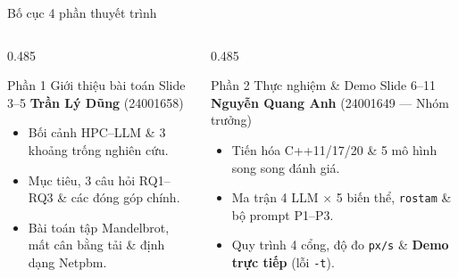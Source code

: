 \documentclass[aspectratio=169,10pt]{beamer}
\newcommand{\currentpart}{Mở đầu}
\newcommand{\setpart}[1]{\renewcommand{\currentpart}{#1}}
\newcommand{\code}[1]{\texttt{\color{BlueDark}#1}}
\begin{document}
\setpart{Mở đầu \textbullet{} Bố cục}
\begin{frame}{Bố cục 4 phần thuyết trình}
\begin{columns}[T,totalwidth=\textwidth]
  \begin{column}{0.485\textwidth}
    \begin{bluebox}[height=2.95cm]{Phần 1 \;\textbullet\; Giới thiệu bài toán \hfill {\scriptsize Slide 3--5}}
      \textbf{\footnotesize Trần Lý Dũng} {\scriptsize(\color{Muted}24001658)}
      \begin{itemize}\scriptsize\setlength{\itemsep}{2pt}
        \item Bối cảnh HPC--LLM \& 3 khoảng trống nghiên cứu.
        \item Mục tiêu, 3 câu hỏi RQ1--RQ3 \& các đóng góp chính.
        \item Bài toán tập Mandelbrot, mất cân bằng tải \& định dạng Netpbm.
      \end{itemize}
    \end{bluebox}
  \end{column}
  \begin{column}{0.485\textwidth}
    \begin{bluebox}[height=2.95cm]{Phần 2 \;\textbullet\; Thực nghiệm \& Demo \hfill {\scriptsize Slide 6--11}}
      \textbf{\footnotesize Nguyễn Quang Anh} {\scriptsize(\color{Muted}24001649 --- Nhóm trưởng)}
      \begin{itemize}\scriptsize\setlength{\itemsep}{2pt}
        \item Tiến hóa C++11/17/20 \& 5 mô hình song song đánh giá.
        \item Ma trận 4 LLM $\times$ 5 biến thể, \code{rostam} \& bộ prompt P1--P3.
        \item Quy trình 4 cổng, độ đo \code{px/s} \& \textbf{Demo trực tiếp} (lỗi \code{-t}).
      \end{itemize}
    \end{bluebox}
  \end{column}
\end{columns}

\vspace{0.28cm}


\end{frame}
\end{document}
